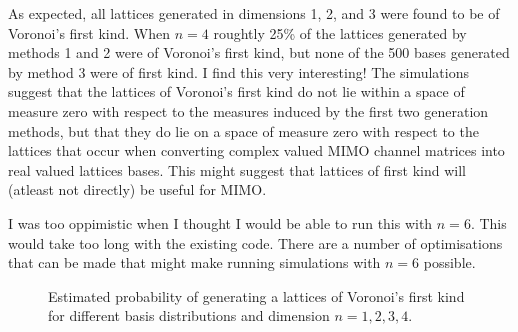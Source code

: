 \documentclass[a4paper,10pt]{article}
\begin{document}
As expected, all lattices generated in dimensions 1, 2, and 3 were found to be of Voronoi's first kind.  When $n=4$ roughtly 25\% of the lattices generated by methods 1 and 2 were of Voronoi's first kind, but none of the 500 bases generated by method 3 were of first kind.  I find this very interesting! The simulations suggest that the lattices of Voronoi's first kind do not lie within a space of measure zero with respect to the measures induced by the first two generation methods, but that they do lie on a space of measure zero with respect to the lattices that occur when converting complex valued MIMO channel matrices into real valued lattices bases.  This might suggest that lattices of first kind will (atleast not directly) be useful for MIMO.

I was too oppimistic when I thought I would be able to run this with $n=6$.  This would take too long with the existing code.  There are a number of optimisations that can be made that might make running simulations with $n=6$ possible.

\begin{figure}[tp]
\centering 
\caption{Estimated probability of generating a lattices of Voronoi's first kind for different basis distributions and dimension $n=1,2,3,4$.}
\end{figure}




 
%
\end{document}
